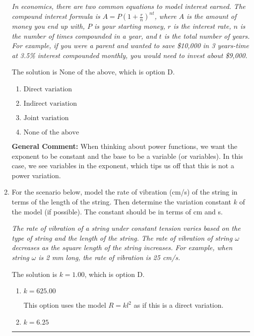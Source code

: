 \documentclass{extbook}[14pt]
\newcommand{\litem}[1]{\item #1

\rule{\textwidth}{0.4pt}}
\begin{document}
\begin{enumerate}
{\begin{center}
    \textit{ In economics, there are two common equations to model interest earned. The compound interest formula is $A = P (1 + \frac{r}{n})^{nt}$, where $A$ is the amount of money you end up with, $P$ is your starting money, $r$ is the interest rate, $n$ is the number of times compounded in a year, and $t$ is the total number of years. For example, if you were a parent and wanted to save \$10,000 in 3 years-time at 3.5\% interest compounded monthly, you would need to invest about \$9,000. }
\end{center}


The solution is \( \text{None of the above} \), which is option D.\begin{enumerate}[label=\Alph*.]
\item \( \text{Direct variation} \)


\item \( \text{Indirect variation} \)


\item \( \text{Joint variation} \)


\item \( \text{None of the above} \)


\end{enumerate}

\textbf{General Comment:} When thinking about power functions, we want the exponent to be constant and the base to be a variable (or variables). In this case, we see variables in the exponent, which tips us off that this is not a power variation.
}
\litem{
For the scenario below, model the rate of vibration (cm/s) of the string in terms of the length of the string. Then determine the variation constant $k$ of the model (if possible). The constant should be in terms of cm and s.

\begin{center}
    \textit{ The rate of vibration of a string under constant tension varies based on the type of string and the length of the string. The rate of vibration of string $\omega$ decreases as the square length of the string increases. For example, when string $\omega$ is 2 mm long, the rate of vibration is 25 cm/s. }
\end{center}


The solution is \( k = 1.00 \), which is option D.\begin{enumerate}[label=\Alph*.]
\item \( k = 625.00 \)

This option uses the model $R = kl^{2}$ as if this is a direct variation.
\item \( k = 6.25 \)


\end{enumerate}}
\end{enumerate}
\end{document}
